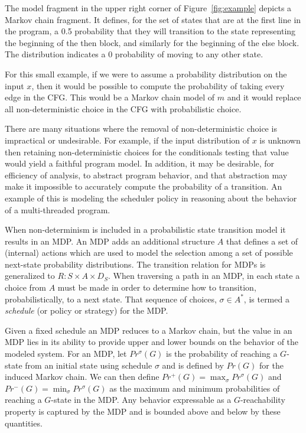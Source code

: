 The model fragment in the upper right corner of 
Figure~\ref{fig:example} depicts a Markov chain fragment.
It defines, for the set of states 
that are at the first line in the program, 
a 0.5 probability that they will transition to 
the state representing the beginning of the then block,
and similarly for the beginning of the else block.  The
distribution indicates a 0 probability of moving to any
other state.

For this small example, if we were to assume a probability
distribution on the input $x$, then it would be possible
to compute the probability of taking every edge in the CFG.   
This would be a Markov chain model of $m$ and it would replace
all non-deterministic choice in the CFG with probabilistic choice.

There are many situations where the removal of non-deterministic
choice is impractical or undesirable.  For example, if the input
distribution of $x$ is unknown then retaining non-deterministic
choices for the conditionals testing that value would yield a
faithful program model.  In addition, it may be desirable, for
efficiency of analysis, to abstract program behavior, and that
abstraction may make it impossible to accurately compute the 
probability of a transition.  An example of this is modeling
the scheduler policy in reasoning about the behavior of a multi-threaded
program.

When non-determinism is included in a probabilistic state
transition model it results in an MDP.  
An MDP adds an additional structure $A$ that defines
a set of (internal) actions which are used to model the
selection among a set of possible next-state probability distributions.
The transition relation
for MDPs is generalized to $R : S \times A \times D_S$.
When traversing a path in an MDP, in each state a choice
from $A$ must be made in order to determine how to transition,
probabilistically, to a next state.   That sequence of choices, 
$\sigma \in A^*$, is termed a \textit{schedule} (or policy or 
strategy) for the MDP.

Given a fixed schedule an MDP reduces to a Markov chain, but
the value in an MDP lies in its ability to provide upper and
lower bounds on the behavior of the modeled system.
For an MDP, let $Pr^{\sigma}(G)$ is the probability of reaching
a $G$-state from an initial state using schedule $\sigma$ and
is defined by $Pr(G)$ for the induced Markov chain.
We can then define 
$Pr^+(G) = \max_{\sigma} Pr^{\sigma}(G)$
and
$Pr^-(G) = \min_{\sigma} Pr^{\sigma}(G)$
as the maximum and minimum probabilities of reaching a $G$-state
in the MDP.  Any behavior expressable as a $G$-reachability property is
captured by the MDP and is bounded above and
below by these quantities.
